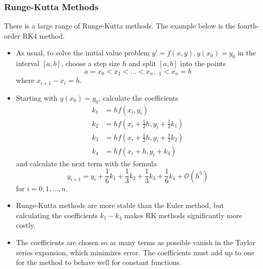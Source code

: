 \documentclass[11pt, a4paper]{article}
\begin{document}
\subsubsection{Runge-Kutta Methods}
There is a large range of Runge-Kutta methods. The example below is the fourth-order RK4 method.
\begin{itemize}
	\item As usual, to solve the initial value problem $ y' = f(x, y),  y(x_{0}) = y_{0} $ in the interval $ [a, b] $, choose a step size $ h $ and split $ [a, b] $ into the points
	\begin{equation*}
		a = x_0 < x_1 < \dots < x_{n-1} < x_{n} = b
	\end{equation*}
	where $ x_{i+1} - x_{i} = h$.
	
	\item Starting with $ y(x_{0}) = y_{0}$, calculate the coefficients 
	\begin{align*}
		 k_{1} &= hf(x_{i}, y_{i}) \\
		 k_{2} &= hf(x_{i} + \frac{1}{2}h, y_{i} + \frac{1}{2} k_{1}) \\
		 k_{3} &= hf(x_{i} + \frac{1}{2}h, y_{i} + \frac{1}{2} k_{2}) \\
		 k_{4} &= hf(x_{i} + h, y_{i} + k_{3})
	\end{align*}
	and calculate the next term with the formula
	\begin{equation*}
		y_{i+1} = y_{i} + \frac{1}{6}k_{1} + \frac{1}{3}k_{2} + \frac{1}{3}k_{3} + \frac{1}{6}k_{4} + \mathcal{O}(h^{5})
	\end{equation*}
	for $ i = 0, 1, \ldots, n $.

	\item Runge-Kutta methods are more stable than the Euler method, but calculating the coefficients $ k_{1}-k_{4} $ makes RK methods significantly more costly.
	
	\item The coefficients are chosen so as many terms as possible vanish in the Taylor series expansion, which minimizes error. The coefficients must add up to one for the method to behave well for constant functions. 

\end{itemize}
\end{document}
